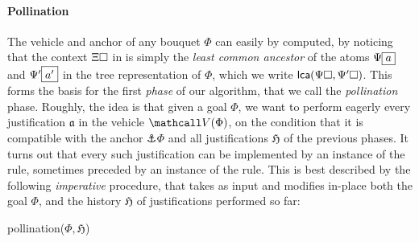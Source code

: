 \paragraph{Pollination}

The vehicle and anchor of any bouquet $\Phi$ can easily by computed, by noticing
that the context $\Xi\square$ in  is simply the \emph{least
common ancestor} of the atoms $\Psi\fbox{$a$}$ and $\Psi'\fbox{$a'$}$ in the
tree representation of $\Phi$, which we write $\mathsf{lca}(\Psi\square,\Psi'\square)$.
This forms the basis for the first \emph{phase} of our algorithm, that we call
the \emph{pollination} phase. Roughly, the idea
is that given a goal $\Phi$, we want to perform eagerly every justification
$\mathfrak{a}$ in the vehicle $\vehicle{\Phi}$, on the condition that it is
compatible with the anchor $\anchor{\Phi}$ and all justifications $\mathfrak{H}$
of the previous phases. It turns out that every such justification can be
implemented by an instance of the  rule, sometimes preceded by an
instance of the  rule. This is best described by the following
\emph{imperative} procedure, that takes as input and modifies in-place both the
goal $\Phi$, and the history $\mathfrak{H}$ of justifications performed so far:

\DontPrintSemicolon

\begin{procedure}[H]
  \caption{pollination($\Phi, \mathfrak{H}$)}
  \BlankLine

\end{procedure}

